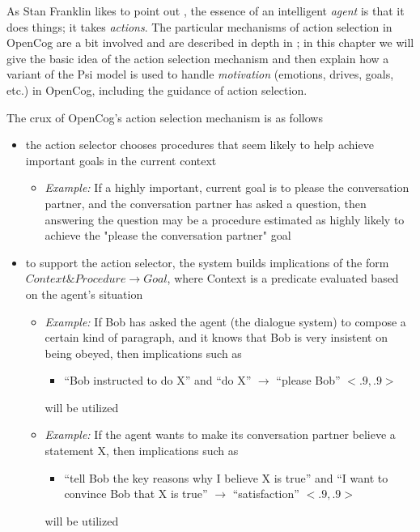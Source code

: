 As Stan Franklin likes to point out \cite{Franklin1995}, the essence of an intelligent {\it agent} is that it does things; it takes {\it actions}.  The particular mechanisms of action selection in OpenCog are a bit involved and are described in depth in \cite{EGI2}; in this chapter we will give the basic idea of the action selection mechanism and then explain how a variant of the Psi model is used to handle {\it motivation} (emotions,  drives, goals, etc.) in OpenCog, including the guidance of action selection.

The crux of OpenCog's action selection mechanism  is  as follows

\begin{itemize}
\item the action selector chooses procedures that seem likely to help achieve important goals in the current context
\begin{itemize}
\item {\it Example:} If a highly important, current goal is to please the conversation partner, and the conversation partner has asked a question, then answering the question may be a procedure estimated as highly likely to achieve the "please the conversation partner" goal
\end{itemize}
\item to support the action selector, the system builds implications of the form $Context \& Procedure \rightarrow Goal$, where Context is a predicate evaluated based on the agent's situation
\begin{itemize}
\item {\it Example:} If Bob has asked the agent (the dialogue system) to compose a certain kind of paragraph, and it knows that Bob is very insistent on being obeyed, then  implications such as
 \begin{itemize}
 \item ``Bob instructed to do X''  and ``do X''  $\rightarrow$ ``please Bob''  $<.9,.9>$
 \end{itemize}
 will be utilized
\item {\it Example:} If the agent wants to make its conversation partner believe a statement X, then implications such as
 \begin{itemize}
 \item ``tell Bob the key reasons why I believe X is true''  and ``I want to convince Bob that X is true''  $\rightarrow$ ``satisfaction''  $<.9,.9>$
 \end{itemize}
 will be utilized 
\end{itemize}

\end{itemize}
